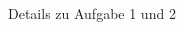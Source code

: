 \documentclass[ucs,11pt]{beamer}
\begin{document}
\begin{frame}{Details zu Aufgabe 1 und 2}
\begin{columns}
\begin{column}{.48\textwidth}
\end{column}%
\hfill%
\begin{column}{.48\textwidth}
\end{column}%
\end{columns}
	

\end{frame}
\end{document}
